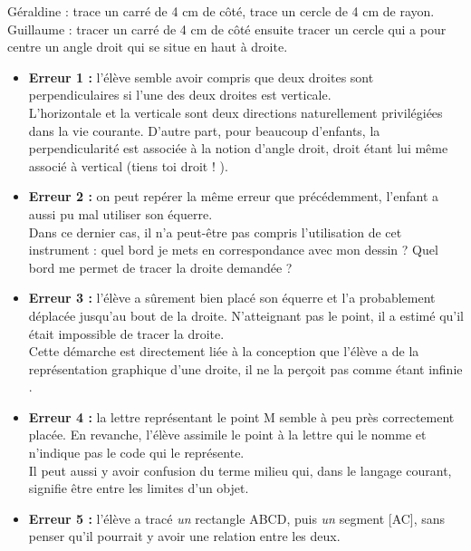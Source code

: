 \begin{exercice}
\begin{minipage}{10cm}
      \textcolor{A1}{Géraldine :} trace un carré de 4 cm de côté, trace un cercle de 4 cm de rayon. \\ [3mm]
      \textcolor{A1}{Guillaume :} tracer un carré de 4 cm de côté ensuite tracer un cercle qui a pour centre un angle droit qui se situe en haut à droite.
   \end{minipage}
\end{exercice}


\begin{corrige}
\begin{itemize}
   \item {\bf Erreur 1 :} l'élève semble avoir compris que deux droites sont perpendiculaires si l'une des deux droites est verticale. \\
   L'horizontale et la verticale sont deux directions naturellement privilégiées dans la vie courante. D'autre part, pour beaucoup d'enfants, la perpendicularité est associée à la notion d'angle droit, droit étant lui même associé à vertical (\og tiens toi droit ! \fg).
   \item {\bf Erreur 2 :} on peut repérer la même erreur que précédemment, l'enfant a aussi pu mal utiliser son équerre. \\
   Dans ce dernier cas, il n'a peut-être pas compris l'utilisation de cet instrument : quel \og bord \fg{} je mets en correspondance avec mon dessin ? Quel \og bord \fg{} me permet de tracer la droite demandée ?
   \item {\bf Erreur 3 :} l'élève a sûrement bien placé son équerre et l'a probablement déplacée jusqu'au \og bout \fg{} de la droite. N'atteignant pas le point, il a estimé qu'il était impossible de tracer la droite. \\
   Cette démarche est directement liée à la conception que l'élève a de la représentation graphique d'une droite, il ne la perçoit pas comme étant \og infinie \fg.
   \item {\bf Erreur 4 :} la lettre représentant le point M semble à peu près correctement placée. En revanche, l'élève assimile le point à la lettre qui le nomme et n'indique pas le code qui le représente. \\
   Il peut aussi y avoir confusion du terme \og milieu \fg{} qui, dans le langage courant, signifie être entre les limites d'un objet.
   \item {\bf Erreur 5 :} l'élève a tracé {\it un} rectangle ABCD, puis {\it un} segment [AC], sans penser qu'il pourrait y avoir une relation entre les deux. \\

\end{itemize}
\end{corrige}
